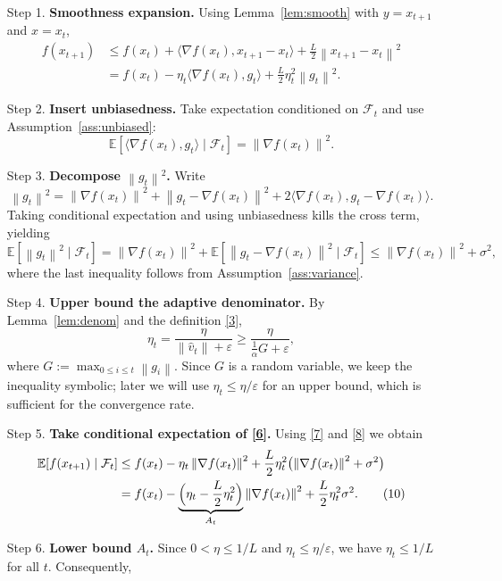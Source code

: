 \documentclass{article}
\newcommand{\E}{\mathbb{E}}
\newcommand{\norm}[1]{\left\|#1\right\|}
\begin{document}
\begin{enumerate}
\item[Step 1.] \textbf{Smoothness expansion.} Using Lemma~\ref{lem:smooth} with $y=x_{t+1}$ and $x=x_t$,
\begin{align}
f(x_{t+1})
&\le f(x_t)+\langle\nabla f(x_t),x_{t+1}-x_t\rangle+\frac{L}{2}\norm{x_{t+1}-x_t}^2 \nonumber\\
&= f(x_t)-\eta_t\langle\nabla f(x_t),g_t\rangle+\frac{L}{2}\eta_t^2\norm{g_t}^2 .
\tag{6}
\end{align}
\item[Step 2.] \textbf{Insert unbiasedness.} Take expectation conditioned on $\mathcal{F}_t$ and use Assumption~\ref{ass:unbiased}:
\[
\E\!\left[\langle\nabla f(x_t),g_t\rangle\mid\mathcal{F}_t\right]
 =\norm{\nabla f(x_t)}^2 .
\tag{7}
\]
\item[Step 3.] \textbf{Decompose $\norm{g_t}^2$.} Write
\[
\norm{g_t}^2=\norm{\nabla f(x_t)}^2
            +\norm{g_t-\nabla f(x_t)}^2
            +2\langle\nabla f(x_t),g_t-\nabla f(x_t)\rangle .
\]
Taking conditional expectation and using unbiasedness kills the cross term, yielding
\[
\E\!\left[\norm{g_t}^2\mid\mathcal{F}_t\right]
= \norm{\nabla f(x_t)}^2 + \E\!\left[\norm{g_t-\nabla f(x_t)}^2\mid\mathcal{F}_t\right]
\le \norm{\nabla f(x_t)}^2+\sigma^2 ,
\tag{8}
\]
where the last inequality follows from Assumption~\ref{ass:variance}.
\item[Step 4.] \textbf{Upper bound the adaptive denominator.} By Lemma~\ref{lem:denom} and the definition \eqref{3},
\[
\eta_t = \frac{\eta}{\norm{\hat v_t}+\varepsilon}
      \ge \frac{\eta}{\frac{1}{\alpha}G+\varepsilon},
\tag{9}
\]
where $G:=\max_{0\le i\le t}\norm{g_i}$. Since $G$ is a random variable, we keep the inequality symbolic; later we will use $\eta_t\le\eta/\varepsilon$ for an upper bound, which is sufficient for the convergence rate.
\item[Step 5.] \textbf{Take conditional expectation of \eqref{6}.} Using \eqref{7} and \eqref{8} we obtain
\begin{align}
\E\!\left[f(x_{t+1})\mid\mathcal{F}_t\right]
&\le f(x_t)-\eta_t\norm{\nabla f(x_t)}^2
   +\frac{L}{2}\eta_t^2\bigl(\norm{\nabla f(x_t)}^2+\sigma^2\bigr) \nonumber\\
&= f(x_t)-\underbrace{\Bigl(\eta_t-\frac{L}{2}\eta_t^2\Bigr)}_{A_t}\norm{\nabla f(x_t)}^2
   +\frac{L}{2}\eta_t^2\sigma^2 .
\tag{10}
\end{align}
\item[Step 6.] \textbf{Lower bound $A_t$.} Since $0<\eta\le1/L$ and $\eta_t\le\eta/\varepsilon$, we have $\eta_t\le 1/L$ for all $t$. Consequently,

\end{enumerate}
\end{document}
